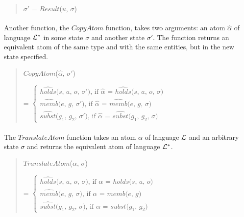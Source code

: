 \documentclass[10pt, twocolumn]{article}
\begin{document}
          \begin{quote}
            $\sigma'$ = $Result$($u$, $\sigma$)
          \end{quote}

        \paragraph{}

          Another function, the $CopyAtom$ function, takes two arguments:
          an atom $\hat{\alpha}$ of language ${\cal L}^{*}$ in some state
          $\sigma$ and another state $\sigma'$. The function returns an
          equivalent atom of the same type and with the same entities,
          but in the new state specified.

          \begin{quote}
            $CopyAtom$($\hat{\alpha}$, $\sigma'$)
 
            = 
            \begin{math}
              \begin{cases}
                \mbox{$\hat{holds}$($s$, $a$, $o$, $\sigma'$), if $\hat{\alpha}$ = $\hat{holds}$($s$, $a$, $o$, $\sigma$)} \\
                \mbox{$\hat{memb}$($e$, $g$, $\sigma'$), if $\hat{\alpha}$ = $\hat{memb}$($e$, $g$, $\sigma$)} \\
                \mbox{$\hat{subst}$($g_{1}$, $g_{2}$, $\sigma'$), if $\hat{\alpha}$ = $\hat{subst}$($g_{1}$, $g_{2}$, $\sigma$)}
              \end{cases}
            \end{math}
          \end{quote}

        \paragraph{}

          The $TranslateAtom$ function takes an atom $\alpha$ of language
          ${\cal L}$ and an arbitrary state $\sigma$ and returns the equivalent
          atom of language ${\cal L}^{*}$.
 
          \begin{quote}
            $TranslateAtom$($\alpha$, $\sigma$)
 
            = 
            \begin{math}
              \begin{cases}
                \mbox{$\hat{holds}$($s$, $a$, $o$, $\sigma$), if $\alpha$ = $holds$($s$, $a$, $o$)} \\
                \mbox{$\hat{memb}$($e$, $g$, $\sigma$), if $\alpha$ = $memb$($e$, $g$)} \\
                \mbox{$\hat{subst}$($g_{1}$, $g_{2}$, $\sigma$), if $\alpha$ = $subst$($g_{1}$, $g_{2}$)}
              \end{cases}
            \end{math}
          \end{quote}
\end{document}
